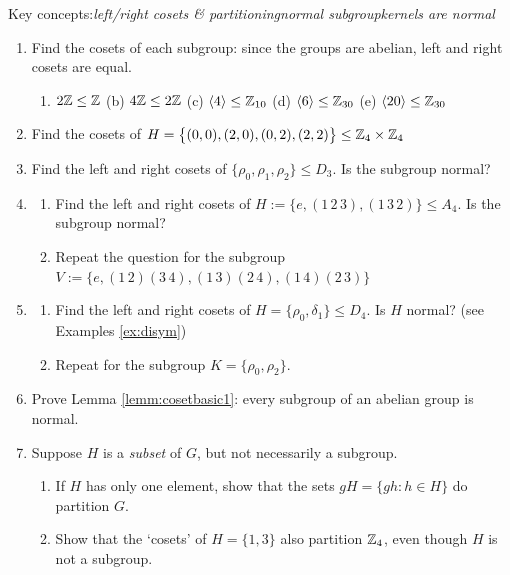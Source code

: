\begin{exercises}{}{}
	Key concepts:\quad \emph{left/right cosets \& partitioning\quad normal subgroup\quad kernels are normal}

	\begin{enumerate}
	  \item Find the cosets of each subgroup: since the groups are abelian, left and right cosets are equal.
		\begin{enumerate}
	  	\item $2\mathbb{Z}\le\mathbb{Z}$\qquad\quad
	  	(b) $4\mathbb{Z}\le 2\mathbb{Z}$\qquad\quad
		  (c) $\left\langle 4\right\rangle\le\mathbb{Z}_{10}$\qquad\quad
		  (d) $\left\langle 6\right\rangle\le\mathbb{Z}_{30}$\qquad\quad
		  (e) $\left\langle 20\right\rangle\le\mathbb{Z}_{30}$
		\end{enumerate}
			
			
		\item\label{exs:VfactorV} Find the cosets of $H=\bigl\{(0,0),(2,0),(0,2),(2,2)\bigr\}\le\mathbb{Z}_4\times\mathbb{Z}_4$
			
			
		\item Find the left and right cosets of $\{\rho_0,\rho_1,\rho_2\}\le D_3$. Is the subgroup normal?
		
		
		\item\label{exs:va4}\begin{enumerate}
		  \item Find the left and right cosets of $H:=\{e,(1\,2\,3),(1\,3\,2)\}\le A_4$. Is the subgroup normal?
		  \item Repeat the question for the subgroup $V:=\{e,(1\,2)(3\,4),(1\,3)(2\,4),(1\,4)(2\,3)\}$
		\end{enumerate}
		
	
		\item\label{exs:d4normal}\begin{enumerate}
		  \item Find the left and right cosets of $H=\{\rho_0,\delta_1\}\le D_4$. Is $H$ normal? (see Examples \ref{ex:disym})
			\item Repeat for the subgroup $K=\{\rho_0,\rho_2\}$.
		\end{enumerate}
	  
	  
	  \item Prove Lemma \ref{lemm:cosetbasic1}: every subgroup of an abelian group is normal.
	  
	  
	  \item\label{exs:partitioncoset} Suppose $H$ is a \emph{subset} of $G$, but not necessarily a subgroup.
	  \begin{enumerate}
	    \item If $H$ has only one element, show that the sets $gH=\{gh:h\in H\}$ do partition $G$.
	    \item Show that the `cosets' of $H=\{1,3\}$ also partition $\mathbb{Z}_4$, even though $H$ is not a subgroup.
	  \end{enumerate}
	  

\end{enumerate}
\end{exercises}
